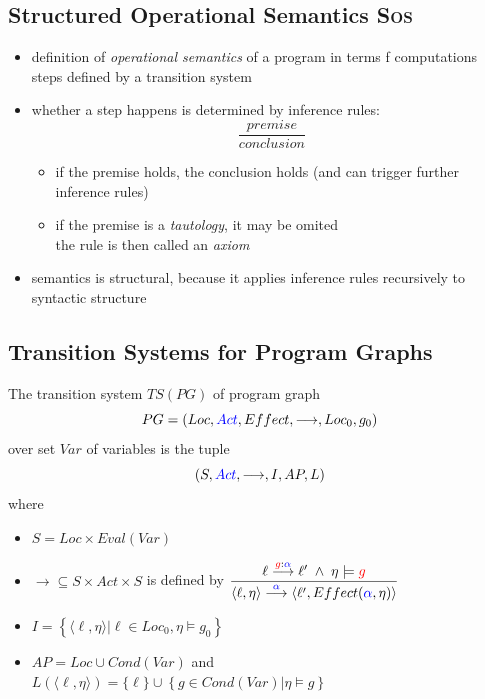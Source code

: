 \documentclass[a4paper, 10pt]{article}
\begin{document}
\subsection*{Structured Operational Semantics \textsc{Sos}}
\begin{itemize}
    \item definition of \emph{operational semantics} of a program in terms f computations steps defined by a transition system
    \item whether a step happens is determined by inference rules: \[ \frac{premise}{conclusion} \]
    \begin{itemize}
        \item if the premise holds, the conclusion holds (and can trigger further inference rules)
        \item if the premise is a \emph{tautology}, it may be omited\\
        the rule is then called an \emph{axiom}
    \end{itemize}
    \item semantics is structural, because it applies inference rules recursively to syntactic structure
\end{itemize}

\subsection*{Transition Systems for Program Graphs}
\begin{shaded}
    The transition system $TS(PG)$ of program graph \[PG=(Loc, \textcolor{blue}{Act}, Effect,\longrightarrow, Loc_0,g_0)\] over set $Var$ of variables is the tuple \[ (S,\textcolor{blue}{Act},\longrightarrow,I,AP,L) \] where
    \begin{itemize}
        \item $S=Loc\times Eval(Var)$
        \item $\longrightarrow\subseteq S\times Act\times S$ is defined by $\displaystyle\frac{\ell\overset{\textcolor{red}{g}:\textcolor{blue}{\alpha}}{\longrightarrow} \ell'\; \wedge \; \eta\models \textcolor{red}{g}}{\langle\ell,\eta\rangle\overset{\textcolor{blue}{\alpha}}{\longrightarrow}\langle\ell',Effect(\textcolor{blue}{\alpha},\eta)\rangle}$
        \item $I=\left\{\langle\ell,\eta\rangle | \ell \in Loc_0,\eta \models g_0\right\}$
        \item $AP=Loc \cup Cond(Var)$ and $L\left(\langle\ell,\eta\rangle\right)=\{\ell\} \cup \left\{ g\in Cond(Var) | \eta \models g \right\} $
    \end{itemize}
\end{shaded}
\end{document}
